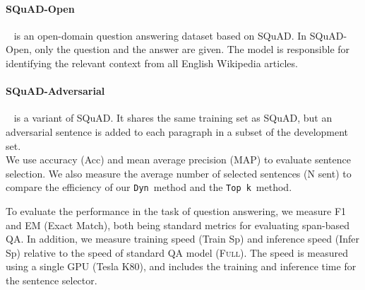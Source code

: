 \documentclass[11pt,a4paper]{article}
\newcommand{\topk}{{\tt Top k}}
\newcommand{\dyn}{{\tt Dyn}}
\newcommand{\fullshort}{(\textsc{Full})}
\begin{document}
\vspace{-.2cm}
\paragraph{SQuAD-Open}~\cite{squad-open} is an open-domain question answering dataset based on SQuAD. In SQuAD-Open, only the question and the answer are given. The model is responsible for identifying the relevant context from all English Wikipedia articles.

\vspace{-.2cm}
\paragraph{SQuAD-Adversarial}~\cite{squad-adversarial} is a variant of SQuAD. It shares the same training set as SQuAD, but an adversarial sentence is added to each paragraph in a subset of the development set. \\

We use accuracy (Acc) and mean average precision (MAP) to evaluate sentence selection.
We also measure the average number of selected sentences (N sent) to compare the efficiency of our \dyn~method and the \topk~method. 

To evaluate the performance in the task of question answering, we measure F1 and EM (Exact Match), both  being standard metrics for evaluating span-based QA.
In addition, we measure training speed (Train Sp) and inference speed (Infer Sp) relative to the speed of standard QA model \fullshort.
The speed is measured using a single GPU (Tesla K80), and includes the training and inference time for the sentence selector.
\end{document}
